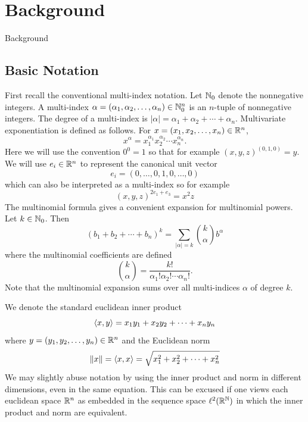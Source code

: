 

\chapter{Background}{Background} \label{chap:background}
\section{Basic Notation}\label{sec:notation}
First recall the conventional multi-index notation. Let $\mathbb{N}_0$ denote the nonnegative integers. A multi-index $\alpha = (\alpha_1, \alpha_2, \ldots, \alpha_n) \in \mathbb{N}_0^n$ is an $n$-tuple of nonnegative integers. The degree of a multi-index is $|\alpha| = \alpha_1 + \alpha_2 + \cdots + \alpha_n$. Multivariate exponentiation is defined as follows. For $x = (x_1, x_2, \ldots, x_n) \in \mathbb{R}^n$,
\[
  x^\alpha = x_1^{\alpha_1}x_2^{\alpha_2} \cdots x_n^{\alpha_n}.
\]
Here we will use the convention $0^0 = 1$ so that for example ${(x, y, z)}^{(0, 1, 0)} = y$. We will use $e_i \in \mathbb{R}^n$ to represent the canonical unit vector
\[
  e_i = (0, \ldots, 0, 1, 0, \ldots, 0)
\]
which can also be interpreted as a multi-index so for example
\[
  (x,y,z)^{2e_1 + e_3} = x^2z
\]
The multinomial formula gives a convenient expansion for multinomial powers. Let $k \in \mathbb{N}_0$. Then
\[
  {(b_1 + b_2 + \cdots + b_n)}^k = \sum_{|\alpha| = k} \binom{k}{\alpha} b^\alpha
\] 
where the multinomial coefficients are defined
\[
  \binom{k}{\alpha} = \frac{k!}{\alpha_1! \alpha_2! \cdots \alpha_n!}.
\]
Note that the multinomial expansion sums over all multi-indices $\alpha$ of degree $k$.

We denote the standard euclidean inner product
\[
  \left\langle x,y \right\rangle = x_1y_1 + x_2y_2 + \cdots + x_n y_n
\]
where $y = (y_1, y_2, \ldots, y_n) \in \mathbb{R}^n$ and the Euclidean norm 
\[
  \left\| x \right\| = \left\langle x, x \right\rangle = \sqrt{x_1^2 + x_2^2 + \cdots + x_n^2}
\]
We may slightly abuse notation by using the inner product and norm in different dimensions, even in the same equation. This can be excused if one views each euclidean space $\mathbb{R}^n$ as embedded in the sequence space $\ell^2(\mathbb{R}^{\mathbb{N}})$ in which the inner product and norm are equivalent.

